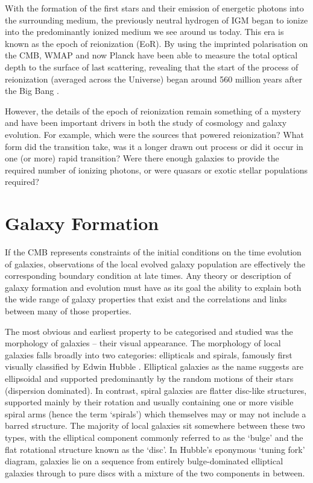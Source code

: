 With the formation of the first stars and their emission of energetic photons into the surrounding medium, the previously neutral hydrogen of IGM began to ionize into the predominantly ionized medium we see around us today. This era is known as the epoch of reionization (EoR). By using the imprinted polarisation on the CMB, WMAP and now Planck have been able to measure the total optical depth to the surface of last scattering, revealing that the start of the process of reionization (averaged across the Universe) began around 560 million years after the Big Bang \citep{2015arXiv150201589P}.

However, the details of the epoch of reionization remain something of a mystery and have been important drivers in both the study of cosmology and galaxy evolution. For example, which were the sources that powered reionization? What form did the transition take, was it a longer drawn out process or did it occur in one (or more) rapid transition? Were there enough galaxies to provide the required number of ionizing photons, or were quasars or exotic stellar populations required? 
 
\section{Galaxy Formation}\label{sec:intro-galform}

If the CMB represents constraints of the initial conditions on the time evolution of galaxies, observations of the local evolved galaxy population are effectively the corresponding boundary condition at late times. Any theory or description of galaxy formation and evolution must have as its goal the ability to explain both the wide range of galaxy properties that exist and the correlations and links between many of those properties.

The most obvious and earliest property to be categorised and studied was the morphology of galaxies -- their visual appearance. The morphology of local galaxies falls broadly into two categories: ellipticals and spirals, famously first visually classified by Edwin Hubble \citep{Hubble:1926be}. Elliptical galaxies as the name suggests are ellipsoidal and supported predominantly by the random motions of their stars (dispersion dominated). In contrast, spiral galaxies are flatter disc-like structures, supported mainly by their rotation and usually containing one or more visible spiral arms (hence the term `spirals') which themselves may or may not include a barred structure. The majority of local galaxies sit somewhere between these two types, with the elliptical component commonly referred to as the `bulge' and the flat rotational structure known as the `disc'. In Hubble's eponymous `tuning fork' diagram, galaxies lie on a sequence from entirely bulge-dominated elliptical galaxies through to pure discs with a mixture of the two components in between.

